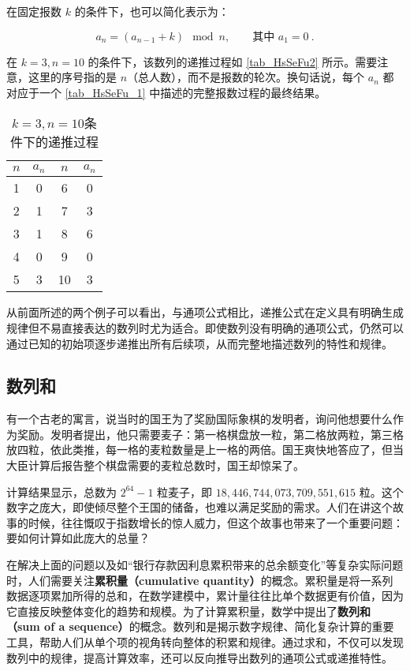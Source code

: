 在固定报数 $k$ 的条件下，也可以简化表示为：

\begin{equation}
a_n = (a_{n-1} + k) \mod n, \qquad \text{其中 } a_{1} = 0~.
\end{equation}

在 $k=3, n=10$ 的条件下，该数列的递推过程如 \autoref{tab_HsSeFu2} 所示。需要注意，这里的序号指的是 $n$（总人数），而不是报数的轮次。换句话说，每个 $a_n$ 都对应于一个 \autoref{tab_HsSeFu_1} 中描述的完整报数过程的最终结果。

\begin{table}[ht]
\centering
\caption{$k=3,n=10$条件下的递推过程}\label{tab_HsSeFu2}
\begin{tabular}{|c|c|c|c|}
\hline
$n$ & $a_n$ & $n$ & $a_n$ \\
\hline
1 & 0 & 6 & 0 \\
\hline
2 & 1 & 7 & 3 \\
\hline
3 & 1 & 8 & 6 \\
\hline
4 & 0 & 9 & 0 \\
\hline
5 & 3 & 10 & 3 \\
\hline
\end{tabular}
\end{table}

从前面所述的两个例子可以看出，与通项公式相比，递推公式在定义具有明确生成规律但不易直接表达的数列时尤为适合。即使数列没有明确的通项公式，仍然可以通过已知的初始项逐步递推出所有后续项，从而完整地描述数列的特性和规律。

\subsection{数列和}

有一个古老的寓言，说当时的国王为了奖励国际象棋的发明者，询问他想要什么作为奖励。发明者提出，他只需要麦子：第一格棋盘放一粒，第二格放两粒，第三格放四粒，依此类推，每一格的麦粒数量是上一格的两倍。国王爽快地答应了，但当大臣计算后报告整个棋盘需要的麦粒总数时，国王却惊呆了。

计算结果显示，总数为 $2^{64} - 1$ 粒麦子，即 $18,446,744,073,709,551,615$ 粒。这个数字之庞大，即使倾尽整个王国的储备，也难以满足奖励的需求。人们在讲这个故事的时候，往往慨叹于指数增长的惊人威力，但这个故事也带来了一个重要问题：要如何计算如此庞大的总量？

在解决上面的问题以及如“银行存款因利息累积带来的总余额变化”等复杂实际问题时，人们需要关注\textbf{累积量（cumulative quantity）}的概念。累积量是将一系列数据逐项累加所得的总和，在数学建模中，累计量往往比单个数据更有价值，因为它直接反映整体变化的趋势和规模。为了计算累积量，数学中提出了\textbf{数列和（sum of a sequence）}的概念。数列和是揭示数字规律、简化复杂计算的重要工具，帮助人们从单个项的视角转向整体的积累和规律。通过求和，不仅可以发现数列中的规律，提高计算效率，还可以反向推导出数列的通项公式或递推特性。

